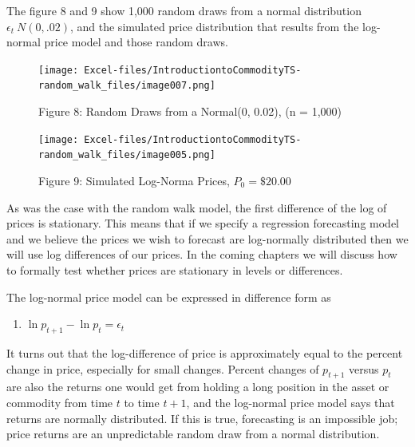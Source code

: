 \documentclass[
  letterpaper,
  DIV=11,
  numbers=noendperiod]{scrreprt}
\providecommand{\tightlist}{%
  \setlength{\itemsep}{0pt}\setlength{\parskip}{0pt}}\usepackage{longtable,booktabs,array}
\begin{document}
The figure 8 and 9 show 1,000 random draws from a normal distribution
\(\epsilon_t ~ N(0, .02)\), and the simulated price distribution that
results from the log-normal price model and those random draws.

\begin{figure}

{\centering \texttt{[image: Excel-files/IntroductiontoCommodityTS-random\_walk\_files/image007.png]}

}

\caption{Figure 8: Random Draws from a Normal(0, 0.02), (n = 1,000)}

\end{figure}

\begin{figure}

{\centering \texttt{[image: Excel-files/IntroductiontoCommodityTS-random\_walk\_files/image005.png]}

}

\caption{Figure 9: Simulated Log-Norma Prices, \(P_0 = \$20.00\)}

\end{figure}

As was the case with the random walk model, the first difference of the
log of prices is stationary. This means that if we specify a regression
forecasting model and we believe the prices we wish to forecast are
log-normally distributed then we will use log differences of our prices.
In the coming chapters we will discuss how to formally test whether
prices are stationary in levels or differences.

The log-normal price model can be expressed in difference form as

\begin{enumerate}
\def\labelenumi{(\arabic{enumi})}
\setcounter{enumi}{6}
\tightlist
\item
  \(\ln{p_{t+1}} - \ln{p_{t}} = \epsilon_t\)
\end{enumerate}

It turns out that the log-difference of price is approximately equal to
the percent change in price, especially for small changes. Percent
changes of \(p_{t+1}\) versus \(p_t\) are also the returns one would get
from holding a long position in the asset or commodity from time \(t\)
to time \(t+1\), and the log-normal price model says that returns are
normally distributed. If this is true, forecasting is an impossible job;
price returns are an unpredictable random draw from a normal
distribution.
\end{document}
